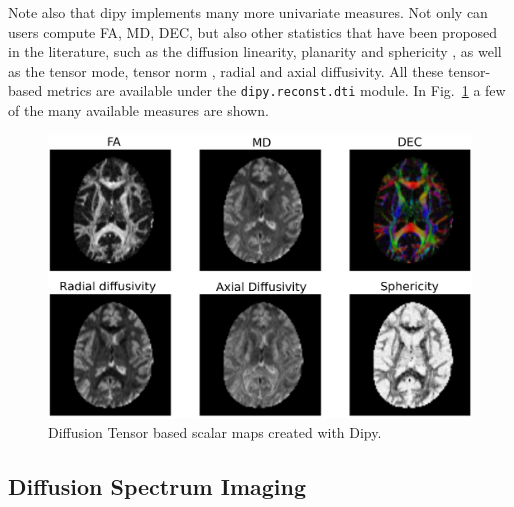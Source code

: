 \documentclass{bioinfo}
\begin{document}
Note also that dipy implements many more univariate measures. Not
only can users compute FA, MD, DEC, but also other statistics that have been
proposed in the literature, such as the diffusion linearity, planarity and
sphericity \citep{westin:97}, as well as the tensor mode, tensor norm
\citep{Ennis2006}, radial and axial diffusivity. All these tensor-based metrics
are available under the \texttt{dipy.reconst.dti} module. In Fig.~\ref{Fig:dti_metrics} a few of the many available measures are shown.

\begin{figure}
\includegraphics[scale=0.45]{Figures/dti_metrics.eps}
\centering{}
\caption{Diffusion Tensor based scalar maps created with Dipy. \label{Fig:dti_metrics}}
\end{figure}

\subsection{Diffusion Spectrum Imaging}\label{dsi}
\end{document}
